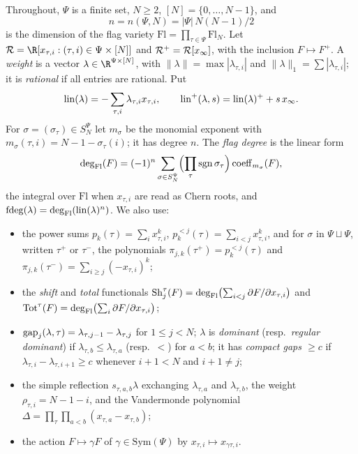 Throughout, $\Psi$ is a finite set, $N\ge2$, $[N]=\{0,\dots,N-1\}$, and
\[
n=n(\Psi,N)=|\Psi|\,N(N-1)/2
\]
is the dimension of the flag variety $\mathrm{Fl}=\prod_{\tau\in\Psi}\mathrm{Fl}_N$. Let
$\volthmR=\R[x_{\tau,i}:(\tau,i)\in\Psi\times[N]]$ and $\mathcal{R}^+=\mathcal{R}[x_\infty]$, with the inclusion
$F\mapsto F^+$. A \emph{weight} is a vector $\lambda\in\R^{\Psi\times[N]}$, with
$\|\lambda\|=\max|\lambda_{\tau,i}|$ and $\|\lambda\|_1=\sum|\lambda_{\tau,i}|$; it is \emph{rational} if all
entries are rational. Put
\[
\mathrm{lin}(\lambda)=-\sum_{\tau,i}\lambda_{\tau,i}x_{\tau,i},\qquad
\mathrm{lin}^+(\lambda,s)=\mathrm{lin}(\lambda)^++s\,x_\infty .
\]
For $\sigma=(\sigma_\tau)\in S_N^\Psi$ let $m_\sigma$ be the monomial exponent with
$m_\sigma(\tau,i)=N-1-\sigma_\tau(i)$; it has degree $n$. The \emph{flag degree} is the linear form
\begin{equation}\label{pf:volthm:eq:degfl}
\deg_{\mathrm{Fl}}(F)=(-1)^n\sum_{\sigma\in S_N^\Psi}\Bigl(\prod_\tau\operatorname{sgn}\sigma_\tau\Bigr)\,
\mathrm{coeff}_{m_\sigma}(F),
\end{equation}
the integral over $\mathrm{Fl}$ when $x_{\tau,i}$ are read as Chern roots, and
$\mathrm{fdeg}(\lambda)=\deg_{\mathrm{Fl}}(\mathrm{lin}(\lambda)^n)$. We also use:
\begin{itemize}
\item the power sums $p_k(\tau)=\sum_ix_{\tau,i}^k$, $p_k^{<j}(\tau)=\sum_{i<j}x_{\tau,i}^k$, and for
  $\sigma$ in $\Psi\sqcup\Psi$, written $\tau^+$ or $\tau^-$, the polynomials
  $\pi_{j,k}(\tau^+)=p^{<j}_k(\tau)$ and $\pi_{j,k}(\tau^-)=\sum_{i\ge j}(-x_{\tau,i})^k$;
\item the \emph{shift} and \emph{total} functionals
  $\mathrm{Sh}_j^\tau(F)=\deg_{\mathrm{Fl}}\bigl(\sum_{i<j}\partial F/\partial x_{\tau,i}\bigr)$ and
  $\mathrm{Tot}^\tau(F)=\deg_{\mathrm{Fl}}\bigl(\sum_{i}\partial F/\partial x_{\tau,i}\bigr)$;
\item $\mathrm{gap}_j(\lambda,\tau)=\lambda_{\tau,j-1}-\lambda_{\tau,j}$ for $1\le j<N$; $\lambda$ is
  \emph{dominant} (resp.\ \emph{regular dominant}) if $\lambda_{\tau,b}\le\lambda_{\tau,a}$ (resp.\ $<$) for
  $a<b$; it has \emph{compact gaps $\ge c$} if $\lambda_{\tau,i}-\lambda_{\tau,i+1}\ge c$ whenever
  $i+1<N$ and $i+1\ne j$;
\item the simple reflection $s_{\tau,a,b}\lambda$ exchanging $\lambda_{\tau,a}$ and $\lambda_{\tau,b}$, the
  weight $\rho_{\tau,i}=N-1-i$, and the Vandermonde polynomial
  $\Delta=\prod_\tau\prod_{a<b}(x_{\tau,a}-x_{\tau,b})$;
\item the action $F\mapsto\gamma F$ of $\gamma\in\mathrm{Sym}(\Psi)$ by $x_{\tau,i}\mapsto x_{\gamma\tau,i}$.
\end{itemize}
